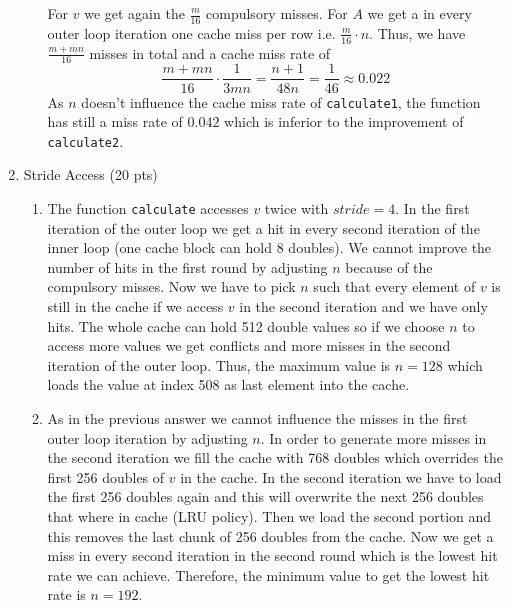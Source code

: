 \documentclass[a4paper]{article}
\begin{document}
\begin{enumerate}
\begin{enumerate}
               For $v$ we get again the $\frac{m}{16}$ compulsory misses. For
               $A$ we get a in every outer loop iteration one cache miss per
               row i.e. $\frac{m}{16} \cdot n$. Thus, we have
               $\frac{m+mn}{16}$ misses in total and a cache miss rate of
               \begin{equation*}
                   \frac{m+mn}{16} \cdot \frac{1}{3mn} = \frac{n+1}{48n}
                   = \frac{1}{46} \approx 0.022
               \end{equation*}
               As $n$ doesn't influence the cache miss rate of
               \texttt{calculate1}, the function has still a miss rate of
               $0.042$ which is inferior to the improvement of
               \texttt{calculate2}.
        \end{enumerate}
    \item Stride Access (20 pts)
\begin{enumerate}
    \item The function \verb|calculate| accesses $v$ twice with $stride=4$. In
        the first iteration of the outer loop we get a hit in every second
        iteration of the inner loop (one cache block can hold 8 doubles). We
        cannot improve the number of hits in the first round by adjusting
        $n$ because of the compulsory misses. Now we have to pick $n$ such that
        every element of $v$ is still in the cache if we access $v$ in the
        second iteration and we have only hits. The whole cache can hold 512 double values so if we
        choose $n$ to access more values we get conflicts and more misses in
        the second iteration of the outer loop. Thus, the maximum value is
        $n=128$ which loads the value at index 508 as last element into the
        cache.

    \item As in the previous answer we cannot influence the misses in the first
        outer loop iteration by adjusting $n$. In order to generate more misses
        in the second iteration we fill the cache with 768 doubles which
        overrides the first 256 doubles of $v$ in the cache. In the second iteration
        we have to load the first 256 doubles again and this will overwrite the
        next 256 doubles that where in cache (LRU policy). Then we load the
        second portion and this removes the last chunk of 256 doubles from the
        cache. Now we get a miss
        in every second iteration in the second round which is the lowest hit
        rate we can achieve. Therefore, the minimum value to get the lowest hit rate is
        $n=192$.


\end{enumerate}
\end{enumerate}
\end{document}
